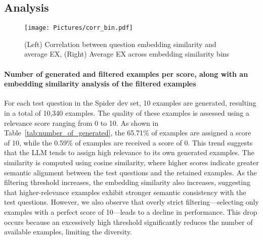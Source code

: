 \subsection{Analysis}

 

\begin{figure*}[t]
\centerline{\texttt{[image: Pictures/corr\_bin.pdf]}}

\caption{(Left) Correlation between question embedding similarity and average EX, (Right) Average EX across embedding similarity bins}
\label{fig:corr_bin}
\end{figure*}

\paragraph{Number of generated and filtered examples per score, along with an embedding similarity analysis of the filtered examples}
For each test question in the Spider dev set, 10 examples are generated, resulting in a total of 10,340 examples. The quality of these examples is assessed using a relevance score ranging from 0 to 10. As shown in Table~\ref{tab:number_of_generated}, the 65.71\% of examples are assigned a score of 10, while the 0.59\% of examples are received a score of 0. This trend suggests that the LLM tends to assign high relevance to its own generated examples. The similarity is computed using cosine similarity, where higher scores indicate greater semantic alignment between the test questions and the retained examples. As the filtering threshold increases, the embedding similarity also increases, suggesting that higher-relevance examples exhibit stronger semantic consistency with the test questions. However, we also observe that overly strict filtering—selecting only examples with a perfect score of 10—leads to a decline in performance. This drop occurs because an excessively high threshold significantly reduces the number of available examples, limiting the diversity.


